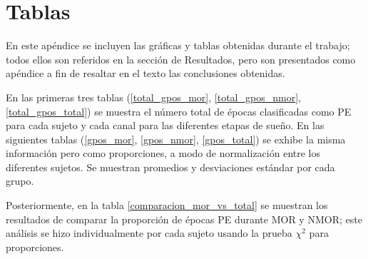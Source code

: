 
\chapter{Tablas}

En este ap\'endice se incluyen las gr\'aficas y tablas obtenidas durante el trabajo; todos ellos 
son referidos en la secci\'on de Resultados, pero son presentados como ap\'endice a fin de resaltar 
en el texto las conclusiones obtenidas.

En las primeras tres tablas (\ref{total_gpos_mor}, \ref{total_gpos_nmor}, \ref{total_gpos_total}) 
se muestra el n\'umero total de \'epocas clasificadas como PE para cada sujeto y cada canal para 
las diferentes etapas de sue\~no. En las siguientes tablas (\ref{gpos_mor}, \ref{gpos_nmor}, 
\ref{gpos_total}) se exhibe la misma informaci\'on pero como proporciones, a modo de 
normalizaci\'on entre los diferentes sujetos. Se muestran promedios y desviaciones est\'andar por 
cada grupo.

Posteriormente, en la tabla \ref{comparacion_mor_vs_total} se muestran los resultados de comparar 
la proporci\'on de \'epocas PE durante MOR y NMOR; este an\'alisis se hizo individualmente por cada
sujeto usando la prueba $\chi^{2}$ para proporciones.


